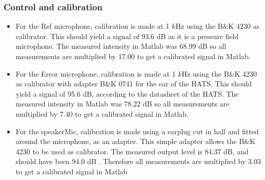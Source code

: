  
\subsubsection{Control and calibration} \label{sec:calAngInc}

\begin{itemize}
	\item For the Ref microphone, calibration is made at 1 $k$Hz using the B\&K 4230 as calibrator. This should yield a signal of 93.6 dB as it is a pressure field microphone. The measured intensity in Matlab was 68.99 dB so all measurements are multiplied by 17.00 to get a calibrated signal in Matlab. 
	\item For the Error microphone, calibration is made at 1 $k$Hz using the B\&K 4230 as calibrator with adapter B\&K 0741 for the ear of the HATS. This should yield a signal of 95.6 dB, according to the datasheet of the HATS. The measured intensity in Matlab was 78.22 dB so all measurements are multiplied by 7.40 to get a calibrated signal in Matlab. 
	\item For the speakerMic, calibration is made using a earplug cut in half and fitted around the microphone, as an adapter. This simple adapter allows the B\&K 4230 to be used as calibrator. The measured output level is 84.37 dB, and should have been 94.0 dB . Therefore all measurements are multiplied by 3.03 to get a calibrated signal in Matlab
\end{itemize} 
 
